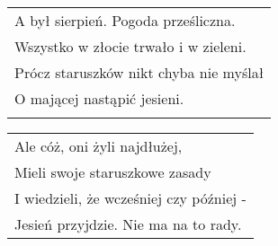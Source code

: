 \documentclass[a5paper]{article}
\begin{document}
\noindent
\begin{tabular}{@{}p{8.50cm}@{}}
A był sierpień. Pogoda prześliczna. \\
Wszystko w złocie trwało i w zieleni. \\
Prócz staruszków nikt chyba nie myślał \\
O mającej nastąpić jesieni. \\ \\
\end{tabular}

\noindent
\begin{tabular}{@{}p{8.50cm}@{}}
Ale cóż, oni żyli najdłużej, \\
Mieli swoje staruszkowe zasady \\
I wiedzieli, że wcześniej czy później - \\
Jesień przyjdzie. Nie ma na to rady. 
\end{tabular}
\end{document}
